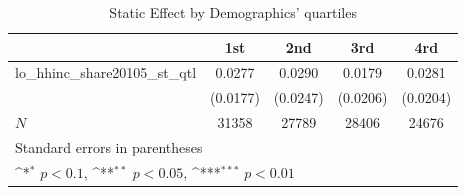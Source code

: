 \begin{table}[htbp]\centering
\def\sym#1{\ifmmode^{#1}\else\(^{#1}\)\fi}
\caption{Static Effect by Demographics' quartiles}
\begin{tabular}{l*{4}{c}}
\hline\hline
            &\multicolumn{1}{c}{1st}&\multicolumn{1}{c}{2nd}&\multicolumn{1}{c}{3rd}&\multicolumn{1}{c}{4rd}\\
\hline
lo\_hhinc\_share20105\_st\_qtl&      0.0277         &      0.0290         &      0.0179         &      0.0281         \\
            &    (0.0177)         &    (0.0247)         &    (0.0206)         &    (0.0204)         \\
\hline
\(N\)       &       31358         &       27789         &       28406         &       24676         \\
\hline\hline
\multicolumn{5}{l}{\footnotesize Standard errors in parentheses}\\
\multicolumn{5}{l}{\footnotesize \sym{*} \(p<0.1\), \sym{**} \(p<0.05\), \sym{***} \(p<0.01\)}\\
\end{tabular}
\end{table}
